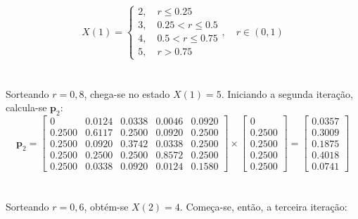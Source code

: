 \documentclass{report}
\begin{document}
\begin{equation*}
X(1) = \begin{cases}
			2, \quad r \leq 0.25\\
			3, \quad 0.25 < r \leq 0.5\\
			4, \quad 0.5 < r \leq 0.75\\
			5, \quad r > 0.75
	   \end{cases}, \quad r \in (0,1)
\end{equation*}\\

\paragraph{} Sorteando $r = 0,8$, chega-se no estado $X(1) = 5$. Iniciando a segunda iteração, calcula-se $\mathbf{p}_2$:\\

\begin{equation*}
\mathbf{p}_2 = \left[ 
\begin{array}{ccccc}
0 & 0.0124 & 0.0338 & 0.0046 & 0.0920 \\ 
0.2500 & 0.6117 & 0.2500 & 0.0920 & 0.2500 \\ 
0.2500 & 0.0920 & 0.3742 & 0.0338 & 0.2500 \\ 
0.2500 & 0.2500 & 0.2500 & 0.8572 & 0.2500 \\ 
0.2500 & 0.0338 & 0.0920 & 0.0124 & 0.1580
\end{array} \right] \times \left[\begin{array}{c}
0 \\ 
0.2500 \\ 
0.2500 \\ 
0.2500 \\ 
0.2500
\end{array} \right] =  \left[\begin{array}{c}
0.0357 \\ 
0.3009 \\ 
0.1875 \\ 
0.4018 \\
0.0741
\end{array} \right]
\end{equation*}\\

\paragraph{} Sorteando $r = 0,6$, obtém-se $X(2) = 4$. Começa-se, então, a terceira iteração:\\
\end{document}
